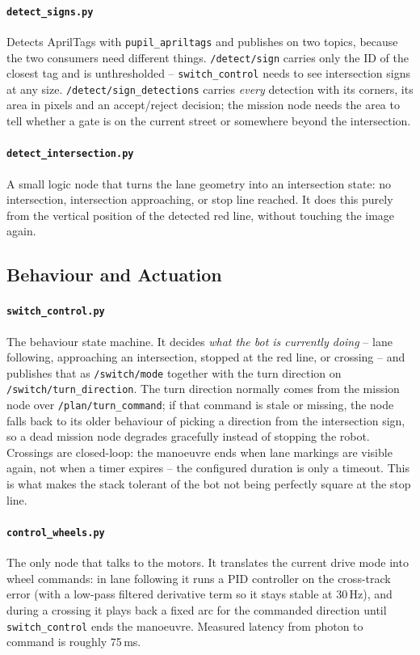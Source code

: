 \documentclass[10pt,a4paper]{article}
\begin{document}
\paragraph{\texttt{detect\_signs.py}} Detects AprilTags with
\texttt{pupil\_apriltags} and publishes on two topics, because the two consumers
need different things. \texttt{/detect/sign} carries only the ID of the closest
tag and is unthresholded -- \texttt{switch\_control} needs to see intersection
signs at any size. \texttt{/detect/sign\_detections} carries \emph{every}
detection with its corners, its area in pixels and an accept/reject decision;
the mission node needs the area to tell whether a gate is on the current street
or somewhere beyond the intersection.

\paragraph{\texttt{detect\_intersection.py}} A small logic node that turns the
lane geometry into an intersection state: no intersection, intersection
approaching, or stop line reached. It does this purely from the vertical
position of the detected red line, without touching the image again.

\subsection{Behaviour and Actuation}

\paragraph{\texttt{switch\_control.py}} The behaviour state machine. It decides
\emph{what the bot is currently doing} -- lane following, approaching an
intersection, stopped at the red line, or crossing -- and publishes that as
\texttt{/switch/mode} together with the turn direction on
\texttt{/switch/turn\_direction}. The turn direction normally comes from the
mission node over \texttt{/plan/turn\_command}; if that command is stale or
missing, the node falls back to its older behaviour of picking a direction from
the intersection sign, so a dead mission node degrades gracefully instead of
stopping the robot. Crossings are closed-loop: the manoeuvre ends when lane
markings are visible again, not when a timer expires -- the configured duration
is only a timeout. This is what makes the stack tolerant of the bot not being
perfectly square at the stop line.

\paragraph{\texttt{control\_wheels.py}} The only node that talks to the motors.
It translates the current drive mode into wheel commands: in lane following it
runs a PID controller on the cross-track error (with a low-pass filtered
derivative term so it stays stable at 30\,Hz), and during a crossing it plays
back a fixed arc for the commanded direction until \texttt{switch\_control} ends
the manoeuvre. Measured latency from photon to command is roughly 75\,ms.
\end{document}
